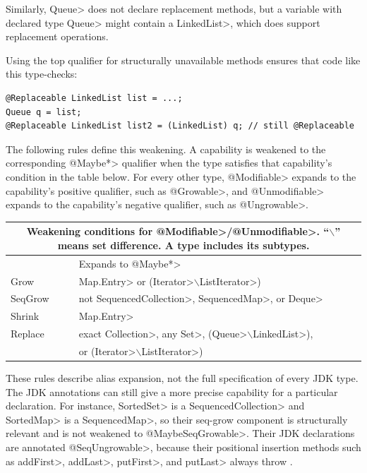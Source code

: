 Similarly, \<Queue> does not declare replacement methods, but a variable
with declared type
\<Queue> might contain a \<LinkedList>, which does support
replacement operations.

Using the top qualifier for structurally unavailable methods ensures that
code like this type-checks:

\begin{Verbatim}
@Replaceable LinkedList list = ...;
Queue q = list;
@Replaceable LinkedList list2 = (LinkedList) q; // still @Replaceable
\end{Verbatim}



The following rules define this weakening.  A capability is weakened to the
corresponding \<@Maybe*> qualifier when the type satisfies that capability's
condition in the table below.  For every other type, \<@Modifiable> expands to
the capability's positive qualifier, such as \<@Growable>, and
\<@Unmodifiable> expands to the capability's negative qualifier, such as
\<@Ungrowable>.



\noindent
\begin{tabular}{l|l}
\multicolumn{2}{c}{Weakening conditions for
\<@Modifiable>/\<@Unmodifiable>. ``$\backslash$'' means set difference.  A
type includes its subtypes.} \\ \hline
& Expands to \<@Maybe*> \\ \hline
Grow
& \<Map.Entry> or (\<Iterator>$\backslash$\<ListIterator>) \\
SeqGrow
& not \<SequencedCollection>, \<SequencedMap>, or \<Deque> \\
Shrink
& \<Map.Entry> \\
Replace
& exact \<Collection>, any \<Set>, (\<Queue>$\backslash$\<LinkedList>), \\
&  or (\<Iterator>$\backslash$\<ListIterator>) \\
\end{tabular}

These rules describe alias expansion, not the full specification of every JDK
type.  The JDK annotations can still give a more precise capability for a
particular declaration.  For instance, \<SortedSet> is a
\<SequencedCollection> and \<SortedMap> is a \<SequencedMap>, so their
seq-grow component is structurally relevant and is not weakened to
\<@MaybeSeqGrowable>.  Their JDK declarations are annotated
\<@SeqUngrowable>, because their positional insertion methods such as
\<addFirst>, \<addLast>, \<putFirst>, and \<putLast> always throw
\UnsupportedOperationException.


